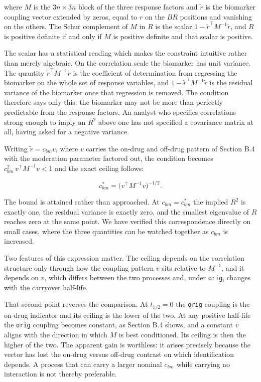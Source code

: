 \documentclass[
  11pt,
]{article}
\begin{document}
where \(M\) is the \(3n \times 3n\) block of the three response factors
and \(\tilde r\) is the biomarker coupling vector extended by zeros,
equal to \(r\) on the \(BR\) positions and vanishing on the others. The
Schur complement of \(M\) in \(R\) is the scalar
\(1 - \tilde r^{\top} M^{-1} \tilde r\), and \(R\) is positive definite
if and only if \(M\) is positive definite and that scalar is positive.

The scalar has a statistical reading which makes the constraint
intuitive rather than merely algebraic. On the correlation scale the
biomarker has unit variance. The quantity
\(\tilde r^{\top} M^{-1} \tilde r\) is the coefficient of determination
from regressing the biomarker on the whole set of response
variables, and \(1 - \tilde r^{\top} M^{-1} \tilde r\) is the residual
variance of the biomarker once that regression is removed. The
condition therefore says only this: the biomarker may not be more
than perfectly predictable from the response factors. An analyst who
specifies correlations strong enough to imply an \(R^2\) above one has
not specified a covariance matrix at all, having asked for a negative
variance.

Writing \(\tilde r = c_{bm} v\), where \(v\) carries the on-drug and
off-drug pattern of Section B.4 with the moderation parameter
factored out, the condition becomes
\(c_{bm}^{2}\, v^{\top} M^{-1} v < 1\) and the exact ceiling follows:

\[
c_{bm}^{\ast} = \bigl(v^{\top} M^{-1} v\bigr)^{-1/2} .
\]

The bound is attained rather than approached. At
\(c_{bm} = c_{bm}^{\ast}\) the implied \(R^2\) is exactly one, the
residual variance is exactly zero, and the smallest eigenvalue of \(R\)
reaches zero at the same point. We have verified this correspondence
directly on small cases, where the three quantities can be watched
together as \(c_{bm}\) is increased.

Two features of this expression matter. The ceiling depends on the
correlation structure only through how the coupling pattern \(v\) sits
relative to \(M^{-1}\), and it depends on \(v\), which differs between
the two processes and, under \texttt{orig}, changes with the
carryover half-life.

That second point reverses the comparison. At \(t_{1/2} = 0\) the
\texttt{orig} coupling is the on-drug indicator and its ceiling is
the lower of the two. At any positive half-life the \texttt{orig}
coupling becomes constant, as Section B.4 shows, and a constant \(v\)
aligns with the direction in which \(M\) is best conditioned. Its
ceiling is then the higher of the two. The apparent gain is
worthless: it arises precisely because the vector has lost the
on-drug versus off-drug contrast on which identification depends. A
process that can carry a larger nominal \(c_{bm}\) while carrying no
interaction is not thereby preferable.
\end{document}
